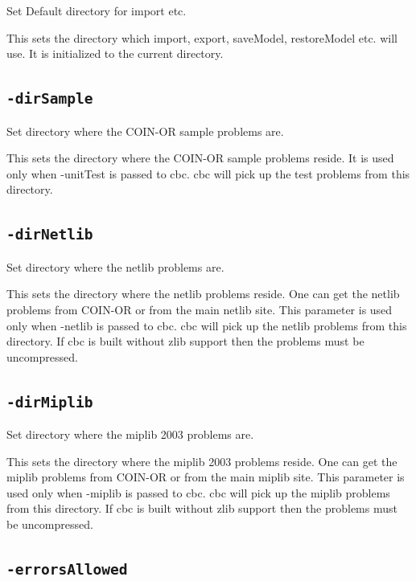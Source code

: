 \documentclass[11pt,a4paper]{article}
\begin{document}
Set Default directory for import etc.

This sets the directory which import, export, saveModel, restoreModel etc. will use. It is initialized to the current directory.

\subsection*{\texttt{-dirSample}}

Set directory where the COIN-OR sample problems are.

This sets the directory where the COIN-OR sample problems reside. It is used only when -unitTest is passed to cbc. cbc will pick up the test problems from this directory.

\subsection*{\texttt{-dirNetlib}}

Set directory where the netlib problems are.

This sets the directory where the netlib problems reside. One can get the netlib problems from COIN-OR or from the main netlib site. This parameter is used only when -netlib is passed to cbc. cbc will pick up the netlib problems from this directory. If cbc is built without zlib support then the problems must be uncompressed.

\subsection*{\texttt{-dirMiplib}}

Set directory where the miplib 2003 problems are.

This sets the directory where the miplib 2003 problems reside. One can get the miplib problems from COIN-OR or from the main miplib site. This parameter is used only when -miplib is passed to cbc. cbc will pick up the miplib problems from this directory. If cbc is built without zlib support then the problems must be uncompressed.

\subsection*{\texttt{-errorsAllowed}}
\end{document}
